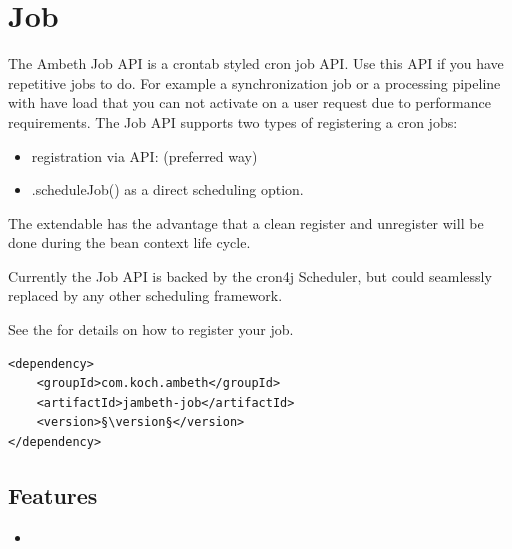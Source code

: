 \section{Job}
\label{module:Job}
\ClearAPI
The Ambeth Job API is a crontab styled cron job API. Use this API if you have repetitive jobs to do. For example a synchronization job or a processing pipeline with have load that you can not activate on a user request due to performance requirements. The Job API supports two types of registering a cron jobs:

\begin{itemize}
	\item registration via  API:  (preferred way)
	\item {}.scheduleJob() as a direct scheduling option.
\end{itemize}

The extendable has the advantage that a clean register and unregister will be done during the bean context life cycle.

Currently the Job API is backed by the cron4j Scheduler, but could seamlessly replaced by any other scheduling framework. 

See the  for details on how to register your job.

\begin{lstlisting}[style=POM,caption={Maven modules to use \emph{Ambeth Job}}]
<dependency>
	<groupId>com.koch.ambeth</groupId>
	<artifactId>jambeth-job</artifactId>
	<version>§\version§</version>
</dependency>
\end{lstlisting}
\subsection{Features}
\begin{itemize}
	\item {}
\end{itemize}

